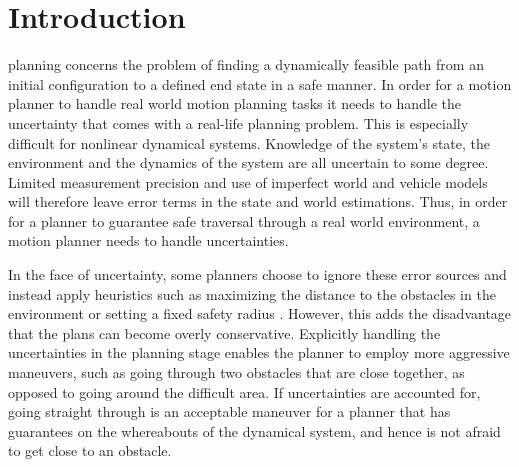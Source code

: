 
\section{Introduction}
 planning concerns the problem of finding a dynamically
feasible path from an initial configuration to a defined end state in a safe
manner. In order for a motion planner to handle real world motion planning tasks
it needs to handle the uncertainty that comes with a real-life planning problem.
This is especially difficult for nonlinear dynamical systems. Knowledge of the
system's state, the environment and the dynamics of the system are all uncertain
to some degree. Limited measurement precision and use of imperfect world and
vehicle models will therefore leave error terms in the state and world
estimations. Thus, in order for a planner to guarantee safe traversal through a
real world environment, a motion planner needs to handle uncertainties.

In the face of uncertainty, some planners choose to ignore these error sources
and instead apply heuristics such as maximizing the distance to the obstacles in
the environment or setting a fixed safety radius
\cite{Hoy2015ClutteredEnvironmentSurvey}. However, this adds the disadvantage
that the plans can become overly conservative. Explicitly handling the
uncertainties in the planning stage enables the planner to employ more
aggressive maneuvers, such as going through two obstacles that are close
together, as opposed to going around the difficult area. If uncertainties are
accounted for, going straight through is an acceptable maneuver for a planner
that has guarantees on the whereabouts of the dynamical system, and hence is not
afraid to get close to an obstacle.




%



